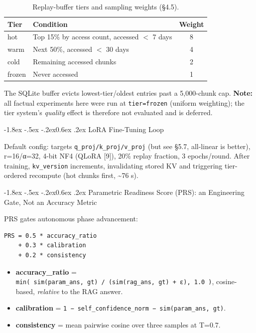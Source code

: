 \documentclass[10pt,twocolumn]{article}
\makeatletter
\providecommand{\tightlist}{\setlength{\itemsep}{0pt}\setlength{\parskip}{0pt}}
\renewcommand\subsection{\@startsection{subsection}{2}{\z@}%
  {-1.8ex \@plus -.5ex \@minus -.2ex}{0.6ex \@plus .2ex}%
  {\normalfont\normalsize\bfseries}}
\makeatother
\begin{document}
\begin{table}[!htbp]
\centering
\caption{Replay-buffer tiers and sampling weights (\S4.5).}
\label{tab:tiers}
\small
\begin{tabularx}{\columnwidth}{@{}l L c@{}}
\toprule
Tier & Condition & Weight \\
\midrule
hot & Top 15\% by access count, accessed $<$ 7 days & 8 \\
warm & Next 50\%, accessed $<$ 30 days & 4 \\
cold & Remaining accessed chunks & 2 \\
frozen & Never accessed & 1 \\
\bottomrule
\end{tabularx}
\end{table}

The SQLite buffer evicts lowest-tier/oldest entries past a 5,000-chunk cap. \textbf{Note:} all factual experiments here were run at \texttt{tier=frozen} (uniform weighting); the tier system's \emph{quality} effect is therefore not evaluated and is deferred.

\hypertarget{lora-fine-tuning-loop}{%
\subsection{LoRA Fine-Tuning Loop}\label{lora-fine-tuning-loop}}

Default config: targets \texttt{q\_proj/k\_proj/v\_proj} (but see §5.7, all-linear is better), r=16/α=32, 4-bit NF4 (QLoRA {[}9{]}), 20\% replay fraction, 3 epochs/round. After training, \texttt{kv\_version} increments, invalidating stored KV and triggering tier-ordered recompute (hot chunks first, \textasciitilde76 s).

\hypertarget{parametric-readiness-score-prs-an-engineering-gate-not-an-accuracy-metric}{%
\subsection{Parametric Readiness Score (PRS): an Engineering Gate, Not an Accuracy Metric}\label{parametric-readiness-score-prs-an-engineering-gate-not-an-accuracy-metric}}

PRS gates autonomous phase advancement:

{\footnotesize
\begin{verbatim}
PRS = 0.5 * accuracy_ratio
    + 0.3 * calibration
    + 0.2 * consistency
\end{verbatim}
}

\begin{itemize}
\tightlist
\item
  \textbf{accuracy\_ratio} = \texttt{min(\ sim(param\_ans,\ gt)\ /\ (sim(rag\_ans,\ gt)\ +\ ε),\ 1.0\ )}, cosine-based, \emph{relative} to the RAG answer.
\item
  \textbf{calibration} = \texttt{1\ −\ \textbar{}self\_confidence\_norm\ −\ sim(param\_ans,\ gt)\textbar{}}.
\item
  \textbf{consistency} = mean pairwise cosine over three samples at T=0.7.
\end{itemize}
\end{document}
